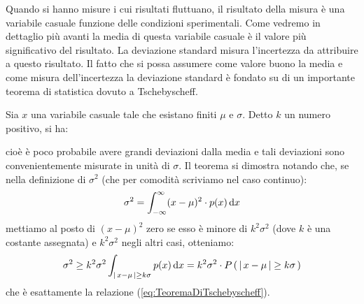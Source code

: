Quando si hanno misure i cui risultati fluttuano, il risultato della
misura \`e una variabile casuale funzione delle condizioni sperimentali.
Come vedremo in dettaglio pi\`u avanti
la media di questa variabile casuale \`e il valore pi\`u
significativo del risultato. La deviazione standard misura
l'incertezza da attribuire a questo risultato.
Il fatto che si possa assumere come valore buono la media e come misura
dell'incertezza la deviazione standard \`e fondato su di un importante teorema
di statistica dovuto a Tschebyscheff.
\begin{teo}[di Tschebyscheff]
Sia $x$ una variabile casuale tale che
esistano finiti $\mu$ e $\sigma$. Detto $k$ un numero positivo, si ha:
\end{teo}
\noindent cio\`e \`e poco probabile avere grandi deviazioni dalla media e
tali deviazioni sono convenientemente misurate in unit\`a di $\sigma$.
Il teorema si dimostra notando che, se nella definizione di $\sigma^2$
(che per comodit\`a scriviamo nel caso continuo):
$$
\sigma^2=\dintegral{(x-\mu)^2 \cdot p(x)}{x}{-\infty}{\infty}
$$
mettiamo al posto di $(x-\mu)^2$ zero se esso \`e minore di $k^2\sigma^2$
(dove $k$ \`e una costante assegnata) e $k^2\sigma^2$ negli altri casi,
otteniamo:
$$
\sigma^2 \ge k^2\sigma^2\dintegral{p(x)}{x}{\abs{x - \mu} \ge k\sigma}{}
=k^2\sigma^2\cdot \prob{\abs{x - \mu} \ge k\sigma}
$$
che \`e esattamente la relazione (\ref{eq:TeoremaDiTschebyscheff}).

\begin{exemplify}


\end{exemplify}

